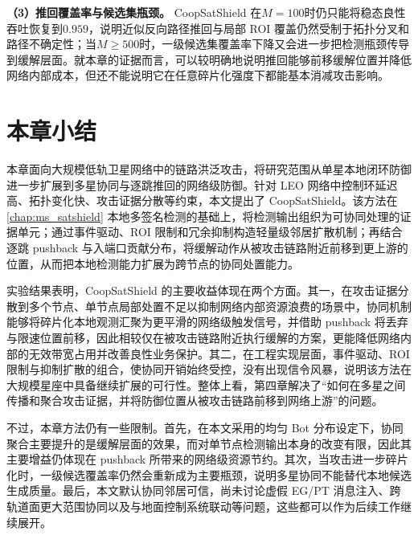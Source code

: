 \textbf{（3）推回覆盖率与候选集瓶颈。} CoopSatShield 在$M=100$时仍只能将稳态良性吞吐恢复到$0.959$，说明近似反向路径推回与局部 ROI 覆盖仍然受制于拓扑分叉和路径不确定性；当$M\ge 500$时，一级候选集覆盖率下降又会进一步把检测瓶颈传导到缓解层面。就本章的证据而言，可以较明确地说明推回能够前移缓解位置并降低网络内部成本，但还不能说明它在任意碎片化强度下都能基本消减攻击影响。

\section{本章小结}
\label{sec:ch4_summary}

本章面向大规模低轨卫星网络中的链路洪泛攻击，将研究范围从单星本地闭环防御进一步扩展到多星协同与逐跳推回的网络级防御。针对 LEO 网络中控制环延迟高、拓扑变化快、攻击证据分散等约束，本文提出了 CoopSatShield。该方法在\ref{chap:ms_satshield} 本地多签名检测的基础上，将检测输出组织为可协同处理的证据单元；通过事件驱动、ROI 限制和冗余抑制构造轻量级邻居扩散机制；再结合逐跳 pushback 与入端口贡献分布，将缓解动作从被攻击链路附近前移到更上游的位置，从而把本地检测能力扩展为跨节点的协同处置能力。

实验结果表明，CoopSatShield 的主要收益体现在两个方面。其一，在攻击证据分散到多个节点、单节点局部处置不足以抑制网络内部资源浪费的场景中，协同机制能够将碎片化本地观测汇聚为更平滑的网络级触发信号，并借助 pushback 将丢弃与限速位置前移，因此相较仅在被攻击链路附近执行缓解的方案，更能降低网络内部的无效带宽占用并改善良性业务保护。其二，在工程实现层面，事件驱动、ROI 限制与抑制扩散的组合，使协同开销始终受控，没有出现信令风暴，说明该方法在大规模星座中具备继续扩展的可行性。整体上看，第四章解决了“如何在多星之间传播和聚合攻击证据，并将防御位置从被攻击链路前移到网络上游”的问题。

不过，本章方法仍有一些限制。首先，在本文采用的均匀 Bot 分布设定下，协同聚合主要提升的是缓解层面的效果，而对单节点检测输出本身的改变有限，因此其主要增益仍体现在 pushback 所带来的网络级资源节约。其次，当攻击进一步碎片化时，一级候选覆盖率仍然会重新成为主要瓶颈，说明多星协同不能替代本地候选生成质量。最后，本文默认协同邻居可信，尚未讨论虚假 EG/PT 消息注入、跨轨道面更大范围协同以及与地面控制系统联动等问题，这些都可以作为后续工作继续展开。
